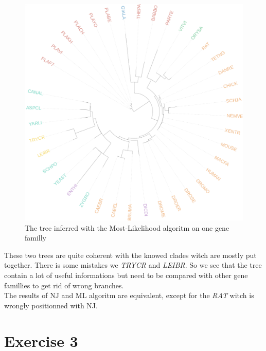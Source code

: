 \documentclass[]{article}
\theoremstyle{definition}
\begin{document}
\begin{figure}[H]
	\includegraphics*[width = \linewidth]{image/Ml_ex2.pdf}
	\caption{ The tree inferred with the Most-Likelihood algoritm on one gene familly}
\end{figure}

These two trees are quite coherent with the knowed clades witch are mostly put together. There is some mistakes we \textit{TRYCR} and \textit{LEIBR}. So we see that the tree contain a lot of useful informations but need to be compared with other gene famillies to get rid of wrong branches. \\
The results of NJ and ML algoritm are equivalent, except for the \textit{RAT} witch is wrongly positionned with NJ.
\section{Exercise 3}
\end{document}
